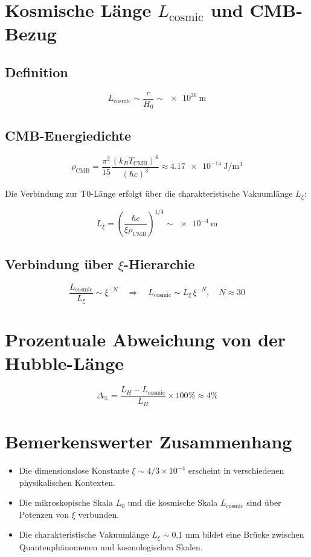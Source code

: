 \documentclass[12pt,a4paper]{article}
\begin{document}
	\section{Kosmische Länge $L_{\mathrm{cosmic}}$ und CMB-Bezug}
	
	\subsection{Definition}
	
	\[
	L_{\mathrm{cosmic}} \sim \frac{c}{H_0} \sim \SI{e26}{\meter}
	\]
	
	\subsection{CMB-Energiedichte}
	
	\[
	\rho_{\mathrm{CMB}} = \frac{\pi^2}{15} \frac{(k_B T_{\mathrm{CMB}})^4}{(\hbar c)^3} \approx \SI{4.17e-14}{\joule\per\cubic\meter}
	\]
	
	Die Verbindung zur T0-Länge erfolgt über die charakteristische Vakuumlänge $L_\xi$:
	
	\[
	L_\xi = \left(\frac{\hbar c}{\xi \rho_{\mathrm{CMB}}}\right)^{1/4} \sim \SI{e-4}{\meter}
	\]
	
	\subsection{Verbindung über $\xi$-Hierarchie}
	
	\[
	\frac{L_{\mathrm{cosmic}}}{L_\xi} \sim \xi^{-N} \quad \Rightarrow \quad L_{\mathrm{cosmic}} \sim L_\xi \, \xi^{-N}, \quad N \approx 30
	\]
	
	\section{Prozentuale Abweichung von der Hubble-Länge}
	
	\[
	\Delta_{\%} = \frac{L_H - L_{\mathrm{cosmic}}}{L_H} \times 100\% \approx 4\%
	\]
	
	\section{Bemerkenswerter Zusammenhang}
	
	\begin{itemize}
		\item Die dimensionslose Konstante $\xi \sim 4/3 \times 10^{-4}$ erscheint in verschiedenen physikalischen Kontexten.
		\item Die mikroskopische Skala $L_0$ und die kosmische Skala $L_{\mathrm{cosmic}}$ sind über Potenzen von $\xi$ verbunden.
		\item Die charakteristische Vakuumlänge $L_\xi \sim 0.1$ mm bildet eine Brücke zwischen Quantenphänomenen und kosmologischen Skalen.
	\end{itemize}
	
\end{document}
